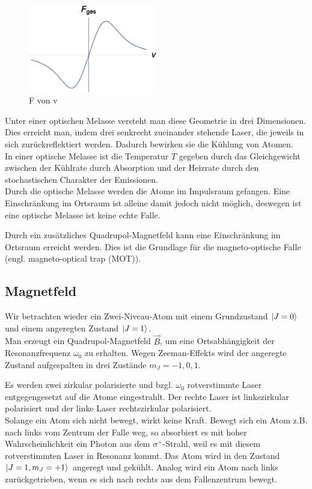 \documentclass[12pt, a4paper]{article}
\begin{document}
   \begin{figure}[h!]
  \centering
  \includegraphics[width=0.5\textwidth]{fvonv.eps}
  \caption{F von v}
  \label{fvonv}
  \end{figure}
  \newpage
  Unter einer optischen Melasse versteht man diese Geometrie in drei Dimensionen. Dies erreicht man, indem drei senkrecht zueinander stehende Laser, die jeweils in sich zurückreflektiert werden. Dadurch bewirken sie die Kühlung von Atomen.
 \\In einer optische Melasse ist die Temperatur ${T}$ gegeben durch das Gleichgewicht zwischen der Kühlrate durch Absorption und der Heizrate durch den stochastischen Charakter der Emissionen.
 \\Durch die optische Melasse werden die Atome im Impulsraum gefangen. Eine Einschränkung im Ortsraum ist alleine damit jedoch nicht möglich, deswegen ist eine optische Melasse ist keine echte Falle.
 
 Durch ein zusätzliches Quadrupol-Magnetfeld kann eine Einschränkung im Ortsraum erreicht werden. Dies ist die Grundlage für die magneto-optische Falle (engl. magneto-optical trap (MOT)).
\subsection{Magnetfeld}
 Wir betrachten wieder ein Zwei-Niveau-Atom mit einem Grundzustand $\ket{J=0}$ und einem angeregten Zustand $\ket{J=1}$. 
  \\Man erzeugt ein Quadrupol-Magnetfeld ${\vec B}$, um eine Ortsabhängigkeit der Resonanzfrequenz ${\omega_0}$ zu erhalten. Wegen Zeeman-Effekts wird der angeregte Zustand aufgespalten in drei Zustände ${m_J=-1,0,1}$.
  
  Es werden zwei zirkular polarisierte und bzgl. $\omega_0$ rotverstimmte Laser entgegengesetzt auf die Atome eingestrahlt. Der rechte Laser ist linkszirkular polarisiert und der linke Laser rechtszirkular polarisiert.
  \\Solange ein Atom sich nicht bewegt, wirkt keine Kraft. Bewegt sich ein Atom z.B. nach links vom Zentrum der Falle weg, so absorbiert es mit hoher Wahrscheinlichkeit ein Photon aus dem ${\sigma^+}$-Strahl, weil es mit diesem rotverstimmten Laser in Resonanz kommt. Das Atom wird in den Zustand $\ket{J=1 , m_J=+1}$ angeregt und gekühlt. Analog wird ein Atom nach links zurückgetrieben, wenn es sich nach rechts aus dem Fallenzentrum bewegt. 
\end{document}
